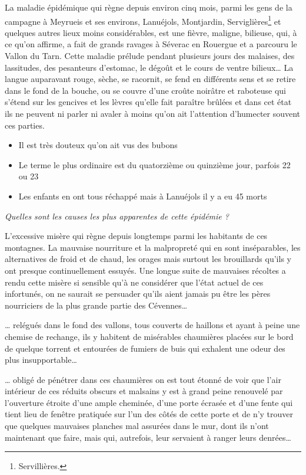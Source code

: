 {\fontsize{10.25}{12.1}\selectfont
La maladie épidémique qui règne depuis environ cinq mois, parmi les gens de la campagne à Meyrueis et ses environs, Lanuéjols, Montjardin, Serviglières\footnote{Servillières.} et quelques autres lieux moins considérables, est une fièvre, maligne, bilieuse, qui, à ce qu’on affirme, a fait de grands ravages à Séverac en Rouergue et a parcouru le Vallon du Tarn. Cette maladie prélude pendant plusieurs jours des malaises, des lassitudes, des pesanteurs d’estomac, le dégoût et le cours de ventre bilieux… La langue auparavant rouge, sèche, se racornit, se fend en différents sens et se retire dans le fond de la bouche, ou se couvre d’une croûte noirâtre et raboteuse qui s’étend sur les gencives et les lèvres qu’elle fait paraître brûlées et dans cet état ils ne peuvent ni parler ni avaler à moins qu’on ait l’attention d’humecter souvent ces parties.

\begin{itemize}
\item Il est très douteux qu’on ait vus des bubons
\item Le terme le plus ordinaire est du quatorzième ou quinzième jour, parfois 22 ou 23
\item Les enfants en ont tous réchappé mais à Lanuéjols il y a eu 45 morts
\end{itemize}

\textit{Quelles sont les causes les plus apparentes de cette épidémie ?}


L’excessive misère qui règne depuis longtemps parmi les habitants de ces montagnes. La mauvaise nourriture et la malpropreté qui en sont inséparables, les alternatives de froid et de chaud, les orages mais surtout les brouillards qu’ils y ont presque continuellement essuyés. Une longue suite de mauvaises récoltes a rendu cette misère si sensible qu’à ne considérer que l’état actuel de ces infortunés, on ne saurait se persuader qu’ils aient jamais pu être les pères nourriciers de la plus grande partie des Cévennes…

… relégués dans le fond des vallons, tous couverts de haillons et ayant à peine une chemise de rechange, ils y habitent de misérables chaumières placées sur le bord de quelque torrent et entourées de fumiers de buis qui exhalent une odeur des plus insupportable…

… obligé de pénétrer dans ces chaumières on est tout étonné de voir que l’air intérieur de ces réduits obscurs et malsains y est à grand peine renouvelé par l’ouverture étroite d’une ample cheminée, d’une porte écrasée et d’une fente qui tient lieu de fenêtre pratiquée sur l’un des côtés de cette porte et de n’y trouver que quelques mauvaises planches mal assurées dans le mur, dont ils n’ont maintenant que faire, mais qui, autrefois, leur servaient à ranger leurs denrées…

}
